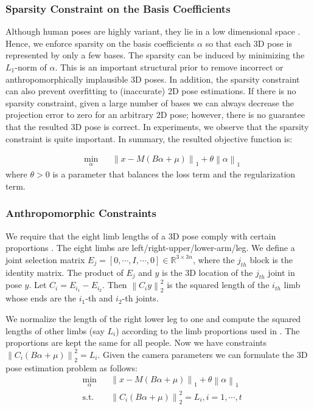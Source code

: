 \documentclass[10pt,twocolumn,letterpaper]{article}
\begin{document}
\subsubsection{Sparsity Constraint on the Basis Coefficients}
Although human poses are highly variant, they lie in a
low dimensional space \cite{Safonova}. Hence, we enforce sparsity on
the basis coefficients $\alpha$ so that each 3D pose is
represented by only a few bases. The sparsity can be induced by
minimizing the $L_1$-norm of $\alpha$. This is an important
structural prior to remove incorrect or anthropomorphically
implausible 3D poses. In addition, the sparsity constraint can
also prevent overfitting to (inaccurate) 2D pose estimations. If
there is no sparsity constraint, given a large number of bases we
can always decrease the projection error to zero for an arbitrary
2D pose; however, there is no guarantee that the resulted 3D pose
is correct. In experiments, we observe that the sparsity
constraint is quite important. In summary, the resulted objective function is:

\begin{equation}
\begin{aligned}
& \underset{\alpha}{\text{min}}
& & { \left\| x-M \left(B \alpha +\mu \right) \right\|_1 + \theta \left\|\alpha\right\|_1}
\end{aligned}
\label{eq:objective}
\end{equation}
where $\theta>0$ is a parameter that balances the loss term and
the regularization term.


\subsubsection{Anthropomorphic Constraints}
We require that the eight limb lengths of a 3D pose comply with
certain proportions \cite{c14}. The eight limbs are
left/right-upper/lower-arm/leg. We define a joint selection matrix $E_j=[0, \cdots, I,
\cdots, 0]\in \mathbb{R}^{3 \times 3n}$, where the $j_{th}$ block is
the identity matrix. The product of $E_j$ and $y$ is the 3D
location of the $j_{th}$ joint in pose $y$. Let
$C_i=E_{i_1}-E_{i_2}$. Then $\left\|C_i y\right\|_2^2$ is the
squared length of the $i_{th}$ limb whose ends are the $i_1$-th
and $i_2$-th joints.

We normalize the length of the right lower leg to one and compute
the squared lengths of other limbs (say $L_i$) according to the limb
proportions used in \cite{c14}. The proportions are kept the same for all
people. Now we have constraints $\left\|C_i \left(B \alpha+\mu
\right) \right\|_2^2 = L_i$. Given the camera parameters we can
formulate the 3D pose estimation problem as follows:
\begin{equation}
\begin{aligned}
& \underset{\alpha}{\text{min}}
& & { \left\| x-M \left(B \alpha +\mu \right) \right\|_1 + \theta \left\| \alpha \right\| _1 } \\
& \text{s.t.}
& & \left\| C_i \left(B \alpha+\mu \right) \right\|_2^2 = L_i, i=1,\cdots,t
\end{aligned}
\label{eq:final}
\end{equation}
\end{document}
